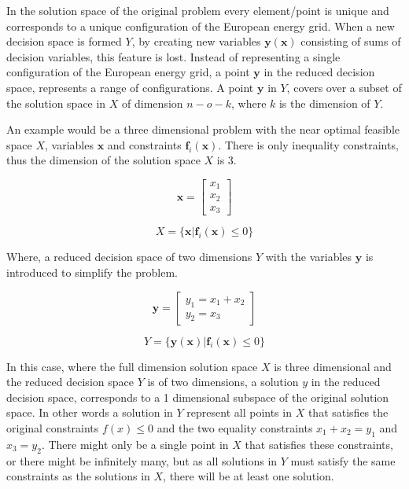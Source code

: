 In the solution space of the original problem every element/point is unique and corresponds to a unique configuration of the European energy grid. When a new decision space is formed $Y$, by creating new variables $\mathbf{y(x)}$ consisting of sums of decision variables, this feature is lost. Instead of representing a single configuration of the European energy grid, a point  $\mathbf{y}$ in the reduced decision space, represents a range of configurations. 
A point $\mathbf{y}$ in $Y$, covers over a subset of the solution space in $X$ of dimension $n-o-k$, where $k$ is the dimension of $Y$. 

An example would be a three dimensional problem with the near optimal feasible space $X$, variables $\mathbf{x}$ and constraints $\mathbf{f}_i(\mathbf{x})$. There is only inequality constraints, thus the dimension of the solution space $X$ is 3. 

\begin{equation}	
	\mathbf{x} = 
	\begin{bmatrix}
		x_{1} \\
		x_{2} \\
		x_{3}
		\end{bmatrix}
\end{equation}

\begin{equation}	
	X = \{ \mathbf{x} | \mathbf{f}_i(\mathbf{x}) \leq 0  \}
\end{equation}

Where, a reduced decision space of two dimensions $Y$ with the variables  $\mathbf{y}$ is introduced to simplify the problem.

\begin{equation}\label{eq:y_variables}	
	\mathbf{y} = 
	\begin{bmatrix}
		y_1 = x_1 + x_2 \\
		y_2= x_3 
	\end{bmatrix}
\end{equation}

\begin{equation}	
Y = \{ \mathbf{y}(\mathbf{x}) | \mathbf{f}_i(\mathbf{x}) \leq 0  \}
\end{equation}

In this case, where the full dimension solution space $X$ is three dimensional and the reduced decision space $Y$ is of two dimensions, a solution $y$ in the reduced decision space, corresponds to a 1 dimensional subspace of the original solution space. In other words a solution in $Y$ represent all points in $X$ that satisfies the original constraints $f(x)\leq0$ and the two equality constraints $ x_1 + x_2 = y_1$ and $x_3 = y_2 $. 
There might only be a single point in $X$ that satisfies these constraints, or there might be infinitely many, but as all solutions in $Y$ must satisfy the same constraints as the solutions in $X$, there will be at least one solution. 


